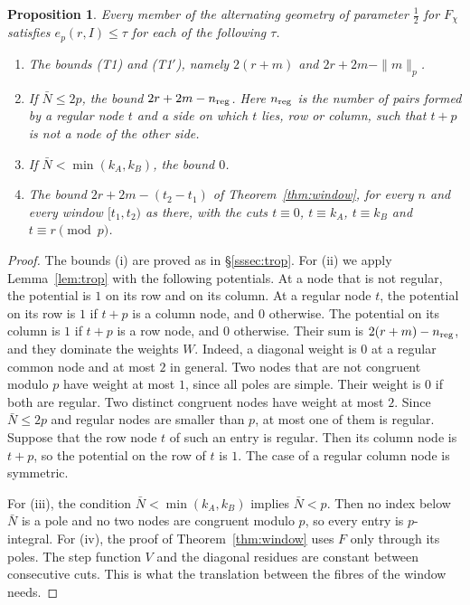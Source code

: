 \documentclass[11pt]{amsart}
\newtheorem{proposition}[theorem]{Proposition}
\theoremstyle{definition}
\theoremstyle{remark}
\numberwithin{equation}{section}
\begin{document}
\begin{proposition}\label{prop:chi3-local}
Every member of the alternating geometry of parameter $\frac12$ for $F_\chi$ satisfies $e_p(r,I)\le\tau$ for each of the
following $\tau$.
\begin{enumerate}[label=(\roman*),leftmargin=*]
\item The bounds (T1) and (T1$'$), namely $2(r+m)$ and $2r+2m-\|m\|_p$.
\item If $\bar N\le2p$, the bound $2r+2m-n_{\rm reg}$. Here $n_{\rm reg}$ is the number of pairs formed by a regular node $t$
 and a side on which $t$ lies, row or column, such that $t+p$ is not a node of the other side.
\item If $\bar N<\min(k_A,k_B)$, the bound $0$.
\item The bound $2r+2m-(t_2-t_1)$ of Theorem~\ref{thm:window}, for every $n$ and every window $[t_1,t_2)$ as there, with
 the cuts $t\equiv0$, $t\equiv k_A$, $t\equiv k_B$ and $t\equiv r\pmod p$.
\end{enumerate}
\end{proposition}

\begin{proof}
The bounds (i) are proved as in \S\ref{sssec:trop}. For (ii) we apply Lemma~\ref{lem:trop} with the following potentials.
At a node that is not regular, the potential is $1$ on its row and on its column. At a regular node $t$, the potential on
its row is $1$ if $t+p$ is a column node, and $0$ otherwise. The potential on its column is $1$ if $t+p$ is a row node,
and $0$ otherwise. Their sum is $2(r+m)-n_{\rm reg}$, and they dominate the weights $W$. Indeed, a diagonal weight is $0$
at a regular common node and at most $2$ in general. Two nodes that are not congruent modulo $p$ have weight at most $1$,
since all poles are simple. Their weight is $0$ if both are regular. Two distinct congruent nodes have weight at most
$2$. Since $\bar N\le2p$ and regular nodes are smaller than $p$, at most one of them is regular. Suppose that the row node $t$
of such an entry is regular. Then its column node is $t+p$, so the potential on the row of $t$ is $1$. The case of a
regular column node is symmetric.

For (iii), the condition $\bar N<\min(k_A,k_B)$ implies $\bar N<p$. Then no index below $\bar N$ is a pole and no two nodes are
congruent modulo $p$, so every entry is $p$-integral. For (iv), the proof of Theorem~\ref{thm:window} uses $F$ only
through its poles. The step function $V$ and the diagonal residues are constant between consecutive cuts. This is what
the translation between the fibres of the window needs.
\end{proof}
\end{document}
